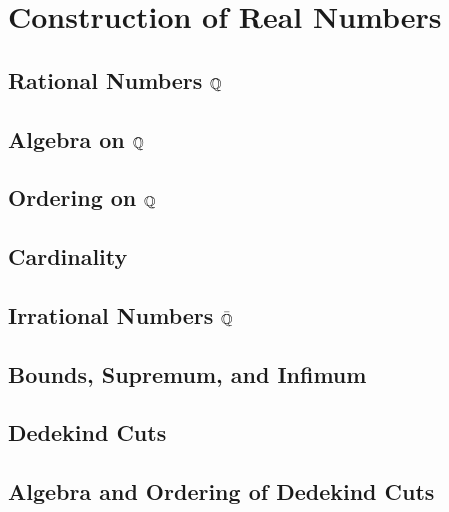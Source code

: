 \chapter{Construction of Real Numbers}

\section{\texorpdfstring{Rational Numbers $\mathbb{Q}$}{Rational Numbers Q}}

\section{\texorpdfstring{Algebra on $\mathbb{Q}$}{Algebra on Q}}

\section{\texorpdfstring{Ordering on $\mathbb{Q}$}{Ordering on Q}}

\section{Cardinality}

\section{\texorpdfstring{Irrational Numbers $\bar{\mathbb{Q}}$}{Irrational Numbers Q}}

\section{Bounds, Supremum, and Infimum}

\section{Dedekind Cuts}

\section{Algebra and Ordering of Dedekind Cuts}
